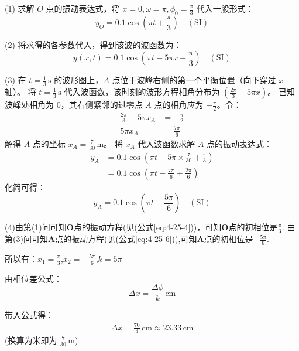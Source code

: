 (1) 求解 $O$ 点的振动表达式，将 $x=0, \omega=\pi, \phi_0=\frac{\pi}{3}$ 代入一般形式：
\begin{equation}\label{eq:4-25-4}
	y_O = 0.1 \cos(\pi t + \frac{\pi}{3}) \quad (\text{SI})
\end{equation}

(2) 将求得的各参数代入，得到该波的波函数为：
\begin{equation}\label{eq:4-25-5}
	y(x,t) = 0.1 \cos(\pi t - 5\pi x + \frac{\pi}{3})\quad (\text{SI})
\end{equation}

(3) 在 $t = \frac{1}{3}\,\text{s}$ 的波形图上，$A$ 点位于波峰右侧的第一个平衡位置（向下穿过 $x$ 轴）。
将 $t = \frac{1}{3}\,\text{s}$ 代入波函数，该时刻的波形方程相角分布为 $(\frac{2\pi}{3} - 5\pi x)$。
已知波峰处相角为 $0$，其右侧紧邻的过零点 $A$ 点的相角应为 $-\frac{\pi}{2}$。令：
\begin{align*}
	\frac{2\pi}{3} - 5\pi x_A &= -\frac{\pi}{2} \\
	5\pi x_A &= \frac{7\pi}{6}
\end{align*}
解得 $A$ 点的坐标 $x_A = \frac{7}{30}\,\text{m}$。
将 $x_A$ 代入波函数求解 $A$ 点的振动表达式：
\begin{align*}
	y_A &= 0.1 \cos(\pi t - 5\pi \times \frac{7}{30} + \frac{\pi}{3}) \\
	&= 0.1 \cos(\pi t - \frac{7\pi}{6} + \frac{2\pi}{6})
\end{align*}
化简可得：
\begin{equation}\label{eq:4-25-6}
	y_A = 0.1 \cos(\pi t - \frac{5\pi}{6}) \quad (\text{SI})
\end{equation}

(4)由第(1)问可知$\mathbf{O}$点的振动方程(见(公式\ref{eq:4-25-4}))，可知$\mathbf{O}$点的初相位是$\frac{\pi}{3}$.
由第(3)问可知$\mathbf{A}$点的振动方程(见(公式\ref{eq:4-25-6})),可知$\mathbf{A}$点的初相位是$-\frac{5\pi}{6}$.

所以有：$x_1=\frac{\pi}{3}$,$x_2=-\frac{5\pi}{6}$,$k=5\pi$

由相位差公式：
\begin{equation}\label{eq:4-25-7}
	\Delta x = \frac{\Delta \phi}{k}\,\text{cm}
\end{equation}

带入公式得：
\begin{align*}
	\Delta x = \frac{70}{3}\,\text{cm} \approx 23.33\,\text{cm}
\end{align*}
(换算为米即为 $\frac{7}{30}\,\text{m}$)

